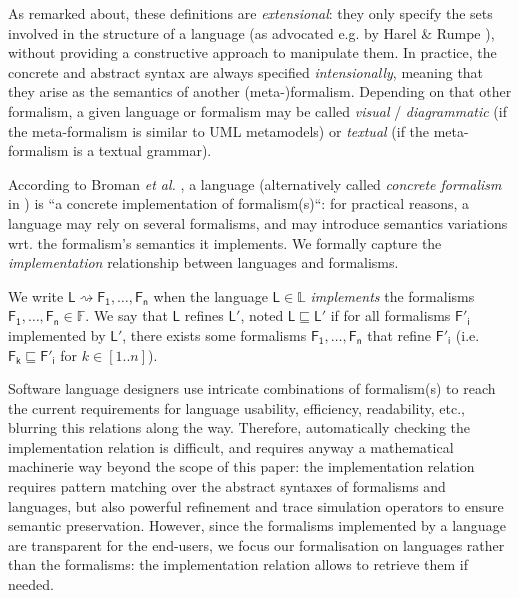 \begin{newdef}
%
As remarked about, these definitions are \emph{extensional}: they only specify the sets
involved in the structure of a language (as advocated e.g. by Harel \& Rumpe 
\cite{J:Harel-Rumpe:2004}), without providing a constructive approach to 
manipulate them. In practice, the concrete and abstract syntax are always specified \emph{intensionally}, meaning that they arise as the semantics of another (meta-)formalism. Depending on that other formalism, a given language or formalism may be called \emph{visual} / \emph{diagrammatic} (if the meta-formalism is similar to UML metamodels) or \emph{textual} (if the meta-formalism is a textual grammar).
\end{newdef}
\begin{olddef}
According to Broman \emph{et al.} \cite{Broman-etAl:2012}, a language 
(alternatively called \emph{concrete formalism} in \cite{P:MPM:2006}) is ``a 
concrete implementation of formalism(s)``: 
for practical reasons, a language may rely on several 
formalisms, and may introduce semantics variations wrt. the formalism's 
semantics it implements. We formally capture the \emph{implementation} 
relationship between languages and formalisms.
\begin{Definition}
   
   We write $\mathsf{L} \rightsquigarrow \mathsf{F_1}, \ldots, \mathsf{F_n}$ 
when the language $\mathsf{L}\in\mathbb{L}$ \emph{implements} the formalisms 
$\mathsf{F_1}, \ldots, \mathsf{F_n}\in\mathbb{F}$. We say that $\mathsf{L}$ 
refines $\mathsf{L'}$, noted $\mathsf{L} \sqsubseteq \mathsf{L'}$ if for all 
formalisms $\mathsf{F'_i}$ implemented by $\mathsf{L'}$, there exists some 
formalisms $\mathsf{F_1}, \ldots, \mathsf{F_n}$ that refine $\mathsf{F'_i}$ 
(i.e. $\mathsf{F_k} \sqsubseteq \mathsf{F'_i}$ for $k\in [1..n]$).
\end{Definition}
\end{olddef}
\noindent
Software language designers use intricate combinations of formalism(s) to reach 
the current requirements for language usability, efficiency, readability, etc., 
blurring this relations along the way. 
Therefore, automatically checking the implementation relation is difficult, and 
requires anyway a mathematical machinerie way beyond the scope of this paper: 
the implementation relation requires pattern matching over the abstract 
syntaxes of formalisms and languages, but also powerful refinement and 
trace simulation operators to ensure semantic preservation. 
However, since the formalisms implemented by a language are transparent for the 
end-users, we focus our formalisation on languages rather than the formalisms: 
the implementation relation allows to retrieve them if needed.

